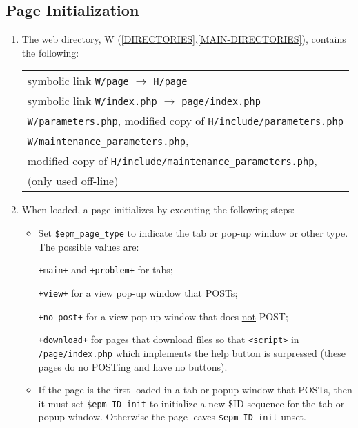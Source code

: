 \documentclass[12pt]{article}
\newcommand{\EOL}{\penalty \exhyphenpenalty}
\newcommand{\sref}[2]{(\ref{#1}.\ref{#2})}
\begin{document}
\subsection{Page Initialization}
\label{PAGE-INITIALIZATION}

\begin{enumerate}
\item The web directory, W \sref{DIRECTORIES}{MAIN-DIRECTORIES},
     contains the following:\label{W-CONTENTS}

  \hspace*{0.2in}\begin{tabular}{l}
      symbolic link {\tt W/page} $\longrightarrow$ {\tt H/page} \\
      symbolic link {\tt W/index.php}
          $\longrightarrow$ {\tt page/index.php} \\
      {\tt W/parameters.php}, modified copy of {\tt H/include/parameters.php} \\
      {\tt W/maintenance\_parameters.php}, \\
      \hspace*{0.2in}modified copy of
           {\tt H/include/maintenance\_parameters.php}, \\
      \hspace*{0.2in}(only used off-line) \\
      \end{tabular}

\item When loaded, a page initializes by executing the following steps:
\begin{itemize}
\item Set {\tt \$epm\_page\_type} to indicate the tab or pop-up window
      or other type.  The possible values are:
      
      {\tt +main+} and {\tt +problem+} for tabs;
      
      {\tt +view+} for a view pop-up window that POSTs;
      
      {\tt +no-post+} for a view pop-up window that does \underline{not}
      POST;
      
      {\tt +download+} for pages that download files
      so that {\tt <script>}
      in {\tt /page/\EOL index.php} which implements the help button
      is surpressed (these pages do no POSTing and have
      no buttons).

\item If the page is the first loaded in a tab or popup-window that POSTs,
      then it must set {\tt \$epm\_ID\_init} to initialize a new
      \$ID sequence for the tab or popup-window.  Otherwise the page
      leaves {\tt \$epm\_ID\_init} unset.


\end{itemize}
\end{enumerate}
\end{document}
